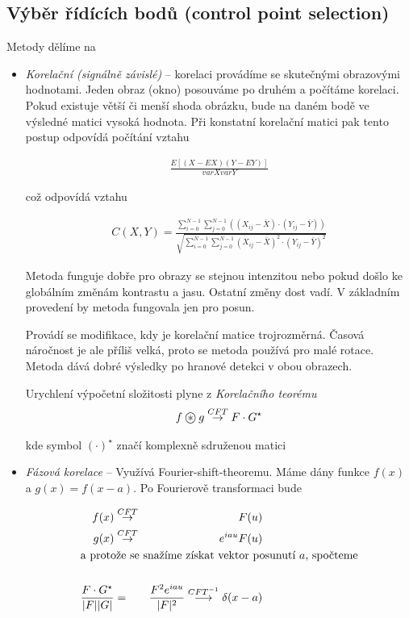 \subsection{Výběr řídících bodů (control point selection)}
Metody dělíme na
\begin{itemize}
\item {\em Korelační (signálně závislé)} -- korelaci provádíme se skutečnými obrazovými hodnotami. Jeden obraz (okno)
posouváme po druhém a počítáme korelaci. Pokud existuje větší či menší shoda obrázku, bude na daném bodě ve výsledné matici
vysoká hodnota. Při konstatní korelační matici pak tento postup odpovídá počítání vztahu

\begin{eqnarray}
\frac{E[(X-EX)(Y-EY)]}{varX varY}
\end{eqnarray}

což odpovídá vztahu

\begin{eqnarray}
C(X,Y)=\frac{\sum\limits_{i=0}^{N-1}
\sum\limits_{j=0}^{N-1}((X_{ij}-\bar{X})\cdot(Y_{ij}-\bar{Y}))}
{\sqrt{\sum\limits_{i=0}^{N-1}\sum\limits_{j=0}^{N-1}(X_{ij}-\bar{X})^2\cdot(Y_{ij}-\bar{Y})^2}}
\end{eqnarray}

Metoda funguje dobře pro obrazy se stejnou intenzitou nebo pokud došlo ke globálním změnám kontrastu a jasu. Ostatní změny
dost vadí. V základním provedení by metoda fungovala jen pro posun. 

Provádí se modifikace, kdy je korelační matice trojrozměrná. Časová náročnost je ale příliš velká, proto se metoda používá
pro malé rotace. Metoda dává dobré výsledky po hranové detekci v obou obrazech.

Urychlení výpočetní složitosti plyne z {\em Korelačního teorému}
\begin{eqnarray}
f\corr g \stackrel{CFT}{\rightarrow}F\cdot G^\star
\end{eqnarray}

kde symbol $(\cdot)^\star$ značí komplexně sdruženou matici

\item {\em Fázová korelace} -- Využívá Fourier-shift-theoremu. Máme dány funkce $f(x)$ a $g(x)=f(x-a)$. Po Fourierově
transformaci bude

\begin{eqnarray}
f(x)&\stackrel{CFT}{\rightarrow}&F(u)\\
g(x)&\stackrel{CFT}{\rightarrow}&e^{iau}F(u)\\
\noalign{\hbox{a protože se snažíme získat vektor posunutí $a$, spočteme}\nonumber}\\
\frac{F\cdot G^\star}{|F||G|}&=&\frac{F^2e^{iau}}{|F|^2}\stackrel{CFT^{-1}}{\longrightarrow}\delta(x-a)
\end{eqnarray}


\end{itemize}
